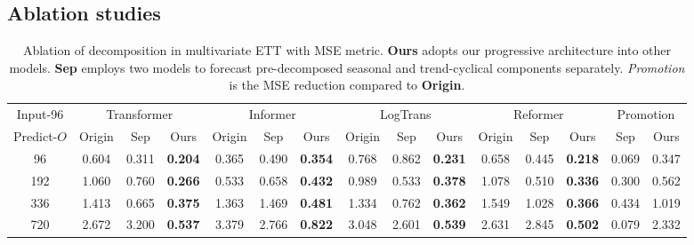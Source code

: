 \subsection{Ablation studies}

\begin{table}[hbp]
    \caption{Ablation of decomposition in multivariate ETT with MSE metric. \textbf{Ours} adopts our progressive architecture into other models. \textbf{Sep} employs two models to forecast pre-decomposed seasonal and trend-cyclical components separately. \emph{Promotion} is the MSE reduction compared to \textbf{Origin}. }\label{tab:ablation_of_decomposition}
    \centering
    \begin{small}
    \renewcommand{\multirowsetup}{\centering}
    \setlength{\tabcolsep}{2.2pt}
    \begin{tabular}{c|cccccccccccc|cc}
    \toprule
    Input-96 & \multicolumn{3}{c}{Transformer\cite{NIPS2017_3f5ee243}} & \multicolumn{3}{c}{Informer\cite{haoyietal-informer-2021}} & \multicolumn{3}{c}{LogTrans\cite{kitaev2020reformer}} & \multicolumn{3}{c}{Reformer\cite{2019Enhancing}} & \multicolumn{2}{c}{Promotion} \\
    \cmidrule(lr){2-4}\cmidrule(lr){5-7}\cmidrule(lr){8-10}\cmidrule(lr){11-13}\cmidrule(lr){14-15}
    Predict-$O$ & Origin & Sep & Ours & Origin & Sep & Ours & Origin & Sep & Ours & Origin & Sep & Ours & Sep & Ours \\
    \toprule
    96 & 0.604 & 0.311 & \textbf{0.204} & 0.365 &0.490 & \textbf{0.354} & 0.768 & 0.862 & \textbf{0.231} & 0.658 &0.445 &  \textbf{0.218} & 0.069 & 0.347 \\
    192 & 1.060 & 0.760 & \textbf{0.266} & 0.533 &0.658 & \textbf{0.432} & 0.989 & 0.533 & \textbf{0.378} & 1.078 &0.510 & \textbf{0.336} & 0.300 & 0.562 \\
    336 & 1.413 & 0.665 & \textbf{0.375} & 1.363 &1.469 & \textbf{0.481} & 1.334 & 0.762 & \textbf{0.362} & 1.549 &1.028 & \textbf{0.366} & 0.434 & 1.019 \\
    720 & 2.672 & 3.200 & \textbf{0.537} & 3.379 &2.766 & \textbf{0.822} & 3.048 &2.601 & \textbf{0.539} & 2.631 & 2.845& \textbf{0.502} & 0.079 & 2.332 \\
    \bottomrule
    \end{tabular}
    \end{small}
    \vspace{-10pt}
\end{table}

